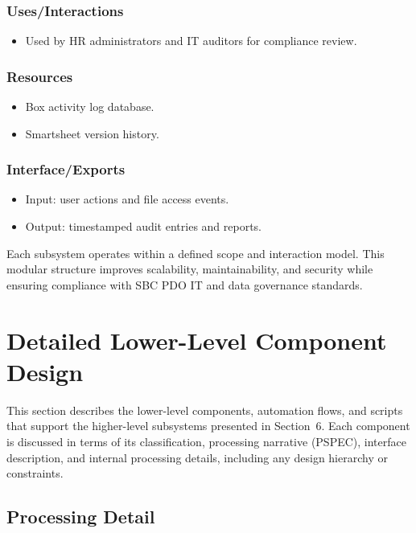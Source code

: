 \documentclass[12pt]{article}
\begin{document}
\subsubsection{Uses/Interactions}
\begin{itemize}[nosep]
  \item Used by HR administrators and IT auditors for compliance review.
\end{itemize}

\subsubsection{Resources}
\begin{itemize}[nosep]
  \item Box activity log database.
  \item Smartsheet version history.
\end{itemize}

\subsubsection{Interface/Exports}
\begin{itemize}[nosep]
  \item Input: user actions and file access events.
  \item Output: timestamped audit entries and reports.
\end{itemize}

\noindent
Each subsystem operates within a defined scope and interaction model.  
This modular structure improves scalability, maintainability, and security while ensuring compliance with SBC PDO IT and data governance standards.


\section{Detailed Lower-Level Component Design}

This section describes the lower-level components, automation flows, and scripts that support the higher-level subsystems presented in Section~6.  
Each component is discussed in terms of its classification, processing narrative (PSPEC), interface description, and internal processing details, including any design hierarchy or constraints.

\subsection{Processing Detail}
\end{document}
